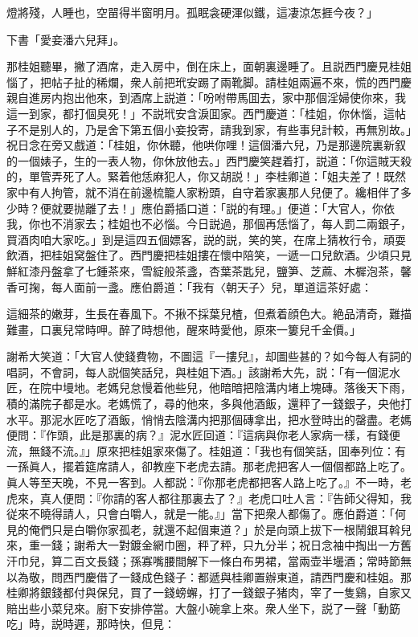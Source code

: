 燈將殘，人睡也，空㽞得半窗明月。孤眠衾硬渾似鐵，這凄涼怎捱今夜？」

下書「愛妾潘六兒拜」。

那桂姐聽畢，撇了酒席，走入房中，倒在床上，面朝裏邊睡了。且説西門慶見桂姐惱了，把帖子扯的稀爛，衆人前把玳安踢了兩靴脚。請桂姐兩遍不來，慌的西門慶親自進房内抱出他來，到酒席上説道：「吩咐帶馬囬去，家中那個淫婦使你來，我這一到家，都打個臭死！」不説玳安含淚囬家。西門慶道：「桂姐，你休惱，這帖子不是别人的，乃是舍下第五個小妾投寄，請我到家，有些事兒計較，再無別故。」祝日念在旁又戲道：「桂姐，你休聽，他哄你哩！這個潘六兒，乃是那邊院裏新叙的一個婊子，生的一表人物，你休放他去。」西門慶笑趕着打，説道：「你這賊天殺的，單管弄死了人。緊着他恁麻犯人，你又胡説！」李桂卿道：「姐夫差了！既然家中有人拘管，就不消在前邊梳籠人家粉頭，自守着家裏那人兒便了。纔相伴了多少時？便就要抛離了去！」應伯爵插口道：「説的有理。」便道：「大官人，你依我，你也不消家去；桂姐也不必惱。今日説過，那個再恁惱了，每人罰二兩銀子，買酒肉咱大家吃。」到是這四五個嫖客，説的説，笑的笑，在席上猜枚行令，頑耍飲酒，把桂姐窝盤住了。西門慶把桂姐摟在懷中陪笑，一遞一口兒飲酒。少頃只見鮮紅漆丹盤拿了七鍾茶來，雪綻般茶盞，杏葉茶匙兒，鹽笋、芝蔴、木樨泡茶，馨香可掬，每人面前一盞。應伯爵道：「我有〈朝天子〉兒，單道這茶好處：

這細茶的嫩芽，生長在春風下。不揪不採葉兒楂，但煮着顔色大。絶品清奇，難描難畫，口裏兒常時呷。醉了時想他，醒來時愛他，原來一簍兒千金價。」

謝希大笑道：「大官人使錢費物，不圖這『一摟兒』，却圖些甚的？如今每人有詞的唱詞，不會詞，每人説個笑話兒，與桂姐下酒。」該謝希大先，説：「有一個泥水匠，在院中墁地。老媽兒怠慢着他些兒，他暗暗把陰溝内堵上塊磚。落後天下雨，積的滿院子都是水。老媽慌了，尋的他來，多與他酒飯，還秤了一錢銀子，央他打水平。那泥水匠吃了酒飯，悄悄去陰溝内把那個磚拿出，把水登時出的罄盡。老媽便問：『作頭，此是那裏的病？』泥水匠回道：『這病與你老人家病一樣，有錢便流，無錢不流。』」原來把桂姐家來傷了。桂姐道：「我也有個笑話，囬奉列位：有一孫眞人，擺着筵席請人，卻教座下老虎去請。那老虎把客人一個個都路上吃了。眞人等至天晚，不見一客到。人都説：『你那老虎都把客人路上吃了。』不一時，老虎來，真人便問：『你請的客人都往那裏去了？』老虎口吐人言：『告師父得知，我従來不曉得請人，只會白嚼人，就是一能。』」當下把衆人都傷了。應伯爵道：「何見的俺們只是白嚼你家孤老，就還不起個東道？」於是向頭上拔下一根鬧銀耳斡兒來，重一錢；謝希大一對鍍金網巾圈，秤了秤，只九分半；祝日念袖中掏出一方舊汗巾兒，算二百文長錢；孫寡嘴腰間解下一條白布男裙，當兩壶半壜酒；常時節無以為敬，問西門慶借了一錢成色錢子：都遞與桂卿置辦東道，請西門慶和桂姐。那桂卿將銀錢都付與保兒，買了一錢螃蠏，打了一錢銀子猪肉，宰了一隻鷄，自家又賠出些小菜兒來。廚下安排停當。大盤小碗拿上來。衆人坐下，説了一聲「動筯吃」時，説時遲，那時快，但見：

